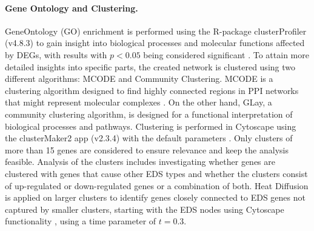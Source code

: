 \paragraph{Gene Ontology and Clustering.}
GeneOntology (GO) enrichment is performed using the R-package clusterProfiler (v4.8.3) to gain insight into biological processes and molecular functions affected by DEGs, with results with $p < 0.05$ being considered significant \cite{Ashburner2000,Consortium2023, Wu2021}. To attain more detailed insights into specific parts, the created network is clustered using two different algorithms: MCODE and Community Clustering. MCODE is a clustering algorithm designed to find highly connected regions in PPI networks that might represent molecular complexes \cite{mcode}. On the other hand, GLay, a community clustering algorithm, is designed for a functional interpretation of biological processes and pathways. Clustering is performed in Cytoscape using the clusterMaker2 app (v2.3.4) with the default parameters \cite{Cytoscape, clusterMaker2}. Only clusters of more than 15 genes are considered to ensure relevance and keep the analysis feasible. Analysis of the clusters includes investigating whether genes are clustered with genes that cause other EDS types and whether the clusters consist of up-regulated or down-regulated genes or a combination of both. Heat Diffusion is applied on larger clusters to identify genes closely connected to EDS genes not captured by smaller clusters, starting with the EDS nodes using Cytoscape functionality \cite{heatDiffusion}, using a time parameter of $t=0.3$.


